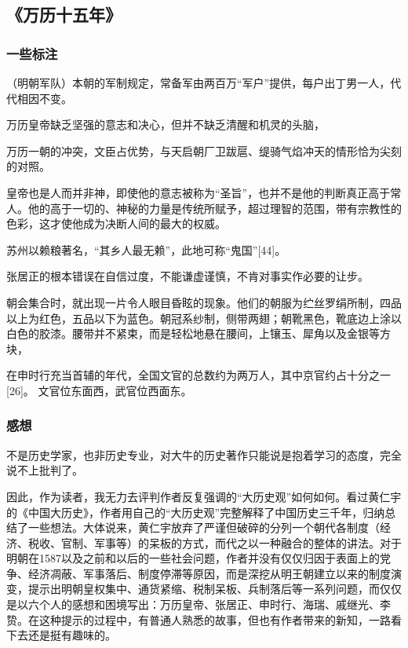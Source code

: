 \subsection{《万历十五年》}

\subsubsection{一些标注}
（明朝军队）本朝的军制规定，常备军由两百万“军户”提供，每户出丁男一人，代代相因不变。

万历皇帝缺乏坚强的意志和决心，但并不缺乏清醒和机灵的头脑，

万历一朝的冲突，文臣占优势，与天启朝厂卫跋扈、缇骑气焰冲天的情形恰为尖刻的对照。

皇帝也是人而并非神，即使他的意志被称为“圣旨”，也并不是他的判断真正高于常人。他的高于一切的、神秘的力量是传统所赋予，超过理智的范围，带有宗教性的色彩，这才使他成为决断人间的最大的权威。

苏州以赖粮著名，“其乡人最无赖”，此地可称“鬼国”[44]。

张居正的根本错误在自信过度，不能谦虚谨慎，不肯对事实作必要的让步。

朝会集合时，就出现一片令人眼目昏眩的现象。他们的朝服为纻丝罗绢所制，四品以上为红色，五品以下为蓝色。朝冠系纱制，侧带两翅；朝靴黑色，靴底边上涂以白色的胶漆。腰带并不紧束，而是轻松地悬在腰间，上镶玉、犀角以及金银等方块，

在申时行充当首辅的年代，全国文官的总数约为两万人，其中京官约占十分之一[26]。
文官位东面西，武官位西面东。

\subsubsection{感想}
不是历史学家，也非历史专业，对大牛的历史著作只能说是抱着学习的态度，完全说不上批判了。

因此，作为读者，我无力去评判作者反复强调的“大历史观”如何如何。看过黄仁宇的《中国大历史》，作者用自己的“大历史观”完整解释了中国历史三千年，归纳总结了一些想法。大体说来，黄仁宇放弃了严谨但破碎的分列一个朝代各制度（经济、税收、官制、军事等）的呆板的方式，而代之以一种融合的整体的讲法。对于明朝在1587以及之前和以后的一些社会问题，作者并没有仅仅归因于表面上的党争、经济凋蔽、军事落后、制度停滞等原因，而是深挖从明王朝建立以来的制度演变，提示出明朝皇权集中、通货紧缩、税制呆板、兵制落后等一系列问题，而仅仅是以六个人的感想和困境写出：万历皇帝、张居正、申时行、海瑞、戚继光、李贽。在这种提示的过程中，有普通人熟悉的故事，但也有作者带来的新知，一路看下去还是挺有趣味的。

